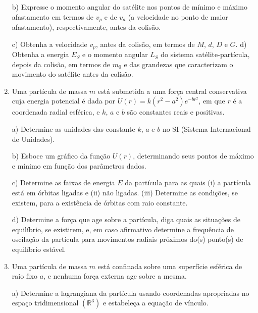 \begin{enumerate}[start=1,label={\bfseries Q\arabic*.}]
\resposta

b) Expresse o momento angular do satélite nos pontos de mínimo e máximo afastamento em termos de $v_{p}$ e de $v_{a}$ (a velocidade no ponto de maior afastamento), respectivamente, antes da colisão.

\resposta

c) Obtenha a velocidade $v_{p}$, antes da colisão, em termos de $M$, $d$, $D$ e $G$.
d) Obtenha a energia $E_{S}$ e o momento angular $L_{S}$ do sistema satélite-partícula, depois da colisão, em termos de $m_{0}$ e das grandezas que caracterizam o movimento do satélite antes da colisão.

\resposta


\item Uma partícula de massa $m$ está submetida a uma força central conservativa cuja energia potencial é dada por $U(r) = k \left( r^{2} - a^{2} \right)e^{-b r^{2}}$, em que $r$ é a coordenada radial esférica, e $k$, $a$ e $b$ são constantes reais e positivas.


a) Determine as unidades das constante $k$, $a$ e $b$ no SI (Sistema Internacional de Unidades).

\resposta

b) Esboce um gráfico da função $U(r)$, determinando seus pontos de máximo e mínimo em função dos parâmetros dados.

\resposta

c) Determine as faixas de energia $E$ da partícula para as quais (i) a partícula está em órbitas ligadas e (ii) não ligadas. (iii) Determine as condições, se existem, para a existência de órbitas com raio constante.

\resposta

d) Determine a força que age sobre a partícula, diga quais as situações de equilíbrio, se existirem, e, em caso afirmativo determine a frequência de oscilação da partícula para movimentos radiais próximos do(s) ponto(s) de equilíbrio estável.

\resposta




\item Uma partícula de massa $m$ está confinada sobre uma superfície esférica de raio fixo $a$, e nenhuma força externa age sobre a mesma.


a) Determine a lagrangiana da partícula usando coordenadas apropriadas no espaço tridimensional $( \mathbb{R}^{3} )$ e estabeleça a equação de vínculo.

\resposta


\end{enumerate}
